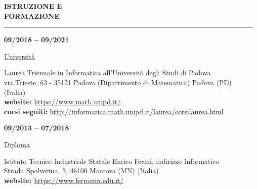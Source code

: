 \begin{minipage}[b]{0.3\textwidth}
	\textbf{ISTRUZIONE E \\FORMAZIONE}
\end{minipage}%
\hfill
\hfill
\begin{minipage}[t]{0.6\textwidth}		
	\rule{\textwidth}{0.4pt}
\end{minipage}%
\vspace{5mm}



\begin{minipage}[t]{0.3\textwidth}
	\textbf{09/2018 – 09/2021}
\end{minipage}%
\hfill
\hfill
\begin{minipage}[t]{0.6\textwidth}		
	\begin{Large}
		\underline{Università} \vspace{5mm}\\
	\end{Large}
	Laurea Triennale in Informatica all'Università degli Studi di Padova\\
	via Trieste, 63 - 35121 Padova (Dipartimento di Matematica) Padova (PD) (Italia) \\
	\textbf{website:} \url{https://www.math.unipd.it/}\\
	\textbf{corsi seguiti:} \url{http://informatica.math.unipd.it/laurea/corsilaurea.html}\\
	\vspace{4mm}
\end{minipage}%


\begin{minipage}[t]{0.3\textwidth}
	\textbf{09/2013 – 07/2018}
\end{minipage}%
\hfill
\hfill
\begin{minipage}[t]{0.6\textwidth}		
	\begin{Large}
		\underline{Diploma} \vspace{5mm}\\
	\end{Large}
	Istituto Tecnico Industriale Statale Enrico Fermi, indirizzo Informatico\\
	Strada Spolverina, 5, 46100 Mantova (MN) (Italia) \\
	\textbf{website:} \url{https://www.fermimn.edu.it/} \vspace{1mm}\\
	\vspace{4mm}
\end{minipage}%